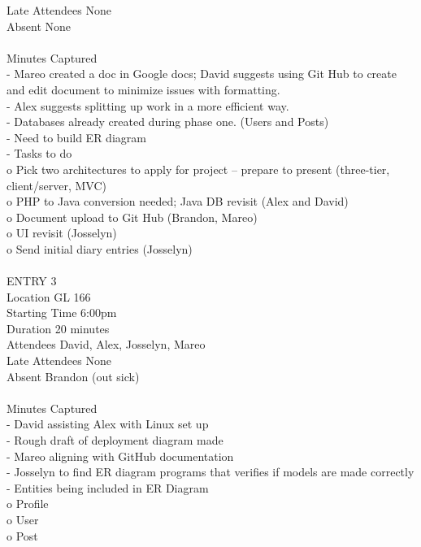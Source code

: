 \documentclass{report}
\begin{document}
Late Attendees	None\\
Absent		None\\
\\
Minutes Captured\\
-	Mareo created a doc in Google docs; David suggests using Git Hub to create and edit document to minimize issues with formatting.\\
-	Alex suggests splitting up work in a more efficient way.\\
-	Databases already created during phase one. (Users and Posts)\\
-	Need to build ER diagram\\
-	Tasks to do\\
o	Pick two architectures to apply for project – prepare to present (three-tier, client/server, MVC)\\
o	PHP to Java conversion needed; Java DB revisit (Alex and David)\\
o	Document upload to Git Hub (Brandon, Mareo)\\
o	UI revisit (Josselyn)\\
o	Send initial diary entries (Josselyn)\\
\\
ENTRY 3\\	
Location		GL 166\\
Starting Time		6:00pm\\
Duration		20 minutes\\
Attendees		David, Alex, Josselyn, Mareo\\
Late Attendees	None\\
Absent		Brandon (out sick)\\
\\
Minutes Captured\\
-	David assisting Alex with Linux set up\\
-	Rough draft of deployment diagram made\\
-	Mareo aligning with GitHub documentation\\
-	Josselyn to find ER diagram programs that verifies if models are made correctly\\
-	Entities being included in ER Diagram\\
o	Profile\\
o	User\\
o	Post\\
\end{document}
